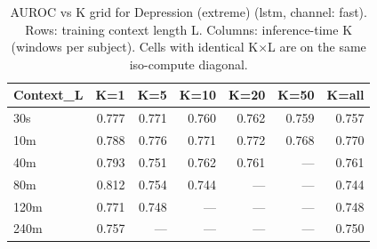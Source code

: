\begin{table}[ht]
\centering
\caption{AUROC vs K grid for Depression (extreme) (lstm, channel: fast). Rows: training context length L. Columns: inference-time K (windows per subject). Cells with identical K×L are on the same iso-compute diagonal.}
\label{tab:kgrid_depression_extreme_binary_lstm_fast}
\begin{tabular}{lrrrrrr}
\toprule
Context_L & K=1 & K=5 & K=10 & K=20 & K=50 & K=all \\
\midrule
30s & 0.777 & 0.771 & 0.760 & 0.762 & 0.759 & 0.757 \\
10m & 0.788 & 0.776 & 0.771 & 0.772 & 0.768 & 0.770 \\
40m & 0.793 & 0.751 & 0.762 & 0.761 & — & 0.761 \\
80m & 0.812 & 0.754 & 0.744 & — & — & 0.744 \\
120m & 0.771 & 0.748 & — & — & — & 0.748 \\
240m & 0.757 & — & — & — & — & 0.750 \\
\bottomrule
\end{tabular}
\end{table}